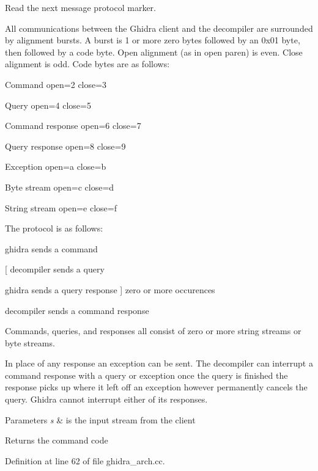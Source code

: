 Read the next message protocol marker. 

All communications between the Ghidra client and the decompiler are surrounded by alignment bursts. A burst is 1 or more zero bytes followed by an 0x01 byte, then followed by a code byte. Open alignment (as in open paren) is even. Close alignment is odd. Code bytes are as follows\+:
\begin{DoxyItemize}
\item Command open=2 close=3
\item Query open=4 close=5
\item Command response open=6 close=7
\item Query response open=8 close=9
\item Exception open=a close=b
\item Byte stream open=c close=d
\item String stream open=e close=f
\end{DoxyItemize}

The protocol is as follows\+:
\begin{DoxyItemize}
\item ghidra sends a command
\begin{DoxyItemize}
\item \mbox{[} decompiler sends a query
\item ghidra sends a query response \mbox{]} zero or more occurences
\end{DoxyItemize}
\item decompiler sends a command response
\end{DoxyItemize}

Commands, queries, and responses all consist of zero or more string streams or byte streams.

In place of any response an exception can be sent. The decompiler can interrupt a command response with a query or exception once the query is finished the response picks up where it left off an exception however permanently cancels the query. Ghidra cannot interrupt either of its responses. 
\begin{DoxyParams}{Parameters}
{\em s} & is the input stream from the client \\
\hline
\end{DoxyParams}
\begin{DoxyReturn}{Returns}
the command code 
\end{DoxyReturn}


Definition at line 62 of file ghidra\+\_\+arch.\+cc.

